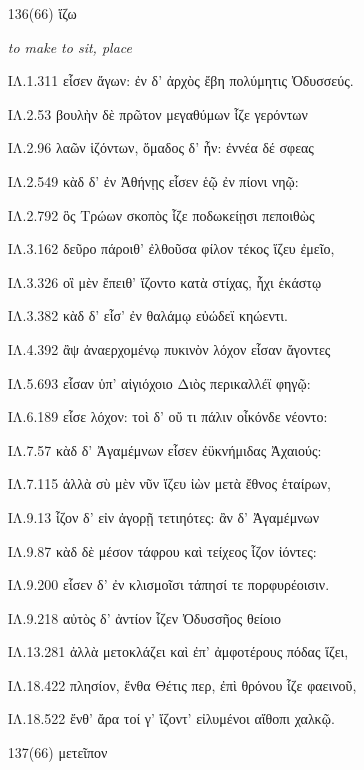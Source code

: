 \begin{enumerate}
{ΙΛ.10.321 ἀλλ' ἄγε μοι τὸ σκῆπτρον ἀνάσχεο, καί μοι ὄμοσσον

ΙΛ.10.461 ὑψόσ' ἀνέσχεθε χειρὶ καὶ εὐχόμενος ἔπος ηὔδα:

ΙΛ.11.594 δούρατ' ἀνασχόμενοι: τῶν δ' ἀντίος ἤλυθεν Αἴας.

}

\clearpage
\item[\large 136(66)]{\large \g ἵζω	}

\hspace{0.2cm} \textit{ to make to sit, place }

{\g
ΙΛ.1.311 εἷσεν ἄγων: ἐν δ' ἀρχὸς ἔβη πολύμητις Ὀδυσσεύς.

ΙΛ.2.53 βουλὴν δὲ πρῶτον μεγαθύμων ἷζε γερόντων

ΙΛ.2.96 λαῶν ἱζόντων, ὅμαδος δ' ἦν: ἐννέα δέ σφεας

ΙΛ.2.549 κὰδ δ' ἐν Ἀθήνῃς εἷσεν ἑῷ ἐν πίονι νηῷ:

ΙΛ.2.792 ὃς Τρώων σκοπὸς ἷζε ποδωκείῃσι πεποιθὼς

ΙΛ.3.162 δεῦρο πάροιθ' ἐλθοῦσα φίλον τέκος ἵζευ ἐμεῖο,

ΙΛ.3.326 οἳ μὲν ἔπειθ' ἵζοντο κατὰ στίχας, ἧχι ἑκάστῳ

ΙΛ.3.382 κὰδ δ' εἷσ' ἐν θαλάμῳ εὐώδεϊ κηώεντι.

ΙΛ.4.392 ἂψ ἀναερχομένῳ πυκινὸν λόχον εἷσαν ἄγοντες

ΙΛ.5.693 εἷσαν ὑπ' αἰγιόχοιο Διὸς περικαλλέϊ φηγῷ:

ΙΛ.6.189 εἷσε λόχον: τοὶ δ' οὔ τι πάλιν οἶκόνδε νέοντο:

ΙΛ.7.57 κὰδ δ' Ἀγαμέμνων εἷσεν ἐϋκνήμιδας Ἀχαιούς:

ΙΛ.7.115 ἀλλὰ σὺ μὲν νῦν ἵζευ ἰὼν μετὰ ἔθνος ἑταίρων,

ΙΛ.9.13 ἷζον δ' εἰν ἀγορῇ τετιηότες: ἂν δ' Ἀγαμέμνων

ΙΛ.9.87 κὰδ δὲ μέσον τάφρου καὶ τείχεος ἷζον ἰόντες:

ΙΛ.9.200 εἷσεν δ' ἐν κλισμοῖσι τάπησί τε πορφυρέοισιν.

ΙΛ.9.218 αὐτὸς δ' ἀντίον ἷζεν Ὀδυσσῆος θείοιο

ΙΛ.13.281 ἀλλὰ μετοκλάζει καὶ ἐπ' ἀμφοτέρους πόδας ἵζει,

ΙΛ.18.422 πλησίον, ἔνθα Θέτις περ, ἐπὶ θρόνου ἷζε φαεινοῦ,

ΙΛ.18.522 ἔνθ' ἄρα τοί γ' ἵζοντ' εἰλυμένοι αἴθοπι χαλκῷ.

}

\clearpage
\item[\large 137(66)]{\large \g μετεῖπον	}


\end{enumerate}
